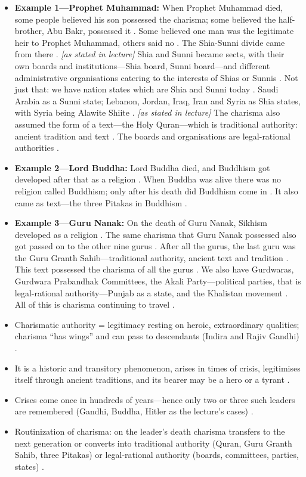 \begin{itemize}
    \item \textbf{Example 1---Prophet Muhammad:} When Prophet Muhammad died, some people believed his son possessed the charisma; some believed the half-brother, Abu Bakr, possessed it . Some believed one man was the legitimate heir to Prophet Muhammad, others said no . The Shia-Sunni divide came from there . \textit{[as stated in lecture]}
    Shia and Sunni became sects, with their own boards and institutions---Shia board, Sunni board---and different administrative organisations catering to the interests of Shias or Sunnis . Not just that: we have nation states which are Shia and Sunni today . Saudi Arabia as a Sunni state; Lebanon, Jordan, Iraq, Iran and Syria as Shia states, with Syria being Alawite Shiite . \textit{[as stated in lecture]}
    The charisma also assumed the form of a text---the Holy Quran---which is traditional authority: ancient tradition and text . The boards and organisations are legal-rational authorities .
    \item \textbf{Example 2---Lord Buddha:} Lord Buddha died, and Buddhism got developed after that as a religion . When Buddha was alive there was no religion called Buddhism; only after his death did Buddhism come in . It also came as text---the three Pitakas in Buddhism .
    \item \textbf{Example 3---Guru Nanak:} On the death of Guru Nanak, Sikhism developed as a religion . The same charisma that Guru Nanak possessed also got passed on to the other nine gurus . After all the gurus, the last guru was the Guru Granth Sahib---traditional authority, ancient text and tradition . This text possessed the charisma of all the gurus .
    We also have Gurdwaras, Gurdwara Prabandhak Committees, the Akali Party---political parties, that is legal-rational authority---Punjab as a state, and the Khalistan movement . All of this is charisma continuing to travel .
\end{itemize}

\begin{QuickRevision}
\begin{itemize}
    \item Charismatic authority = legitimacy resting on heroic, extraordinary qualities; charisma ``has wings'' and can pass to descendants (Indira and Rajiv Gandhi) .
    \item It is a historic and transitory phenomenon, arises in times of crisis, legitimises itself through ancient traditions, and its bearer may be a hero or a tyrant .
    \item Crises come once in hundreds of years---hence only two or three such leaders are remembered (Gandhi, Buddha, Hitler as the lecture's cases) .
    \item Routinization of charisma: on the leader's death charisma transfers to the next generation or converts into traditional authority (Quran, Guru Granth Sahib, three Pitakas) or legal-rational authority (boards, committees, parties, states) .
\end{itemize}
\end{QuickRevision}

